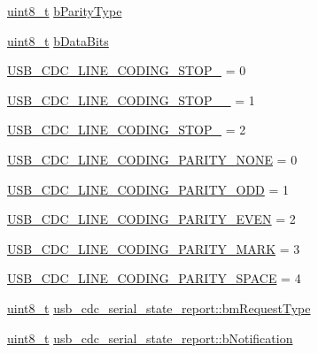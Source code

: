 \begin{DoxyCompactItemize}
\hyperlink{stdint_8h_aba7bc1797add20fe3efdf37ced1182c5}{uint8\-\_\-t} \hyperlink{group___p_i_o_s___u_s_b___d_e_f_s_ga47f5ab7fcc915dedd560214e61438bc3}{b\-Parity\-Type}
\item 
\hyperlink{stdint_8h_aba7bc1797add20fe3efdf37ced1182c5}{uint8\-\_\-t} \hyperlink{group___p_i_o_s___u_s_b___d_e_f_s_gaeb01baccbd5328de664ba39a4c295941}{b\-Data\-Bits}
\item 
\hyperlink{group___p_i_o_s___u_s_b___d_e_f_s_gac4eddf0a8ee341b7b3718d54fd8d3aca}{U\-S\-B\-\_\-\-C\-D\-C\-\_\-\-L\-I\-N\-E\-\_\-\-C\-O\-D\-I\-N\-G\-\_\-\-S\-T\-O\-P\-\_} = 0
\item 
\hyperlink{group___p_i_o_s___u_s_b___d_e_f_s_ga7e2d9fdd2a6d8787acb3822557bccf2f}{U\-S\-B\-\_\-\-C\-D\-C\-\_\-\-L\-I\-N\-E\-\_\-\-C\-O\-D\-I\-N\-G\-\_\-\-S\-T\-O\-P\-\_\-\_} = 1
\item 
\hyperlink{group___p_i_o_s___u_s_b___d_e_f_s_ga3538b3fcf1ee3c5f9f5c6440ee992bab}{U\-S\-B\-\_\-\-C\-D\-C\-\_\-\-L\-I\-N\-E\-\_\-\-C\-O\-D\-I\-N\-G\-\_\-\-S\-T\-O\-P\-\_} = 2
\item 
\hyperlink{group___p_i_o_s___u_s_b___d_e_f_s_gaac4a8093dc70d2faba2bfbecd8f3925e}{U\-S\-B\-\_\-\-C\-D\-C\-\_\-\-L\-I\-N\-E\-\_\-\-C\-O\-D\-I\-N\-G\-\_\-\-P\-A\-R\-I\-T\-Y\-\_\-\-N\-O\-N\-E} = 0
\item 
\hyperlink{group___p_i_o_s___u_s_b___d_e_f_s_gaae8333b5bc558121cfbf15fa45a3995b}{U\-S\-B\-\_\-\-C\-D\-C\-\_\-\-L\-I\-N\-E\-\_\-\-C\-O\-D\-I\-N\-G\-\_\-\-P\-A\-R\-I\-T\-Y\-\_\-\-O\-D\-D} = 1
\item 
\hyperlink{group___p_i_o_s___u_s_b___d_e_f_s_ga9368f7f6c69c75dcf7309d538ac75844}{U\-S\-B\-\_\-\-C\-D\-C\-\_\-\-L\-I\-N\-E\-\_\-\-C\-O\-D\-I\-N\-G\-\_\-\-P\-A\-R\-I\-T\-Y\-\_\-\-E\-V\-E\-N} = 2
\item 
\hyperlink{group___p_i_o_s___u_s_b___d_e_f_s_ga88095a84c73187be8de85b0d2570a1ac}{U\-S\-B\-\_\-\-C\-D\-C\-\_\-\-L\-I\-N\-E\-\_\-\-C\-O\-D\-I\-N\-G\-\_\-\-P\-A\-R\-I\-T\-Y\-\_\-\-M\-A\-R\-K} = 3
\item 
\hyperlink{group___p_i_o_s___u_s_b___d_e_f_s_ga8e20e35ec70602f6991738f7687070ec}{U\-S\-B\-\_\-\-C\-D\-C\-\_\-\-L\-I\-N\-E\-\_\-\-C\-O\-D\-I\-N\-G\-\_\-\-P\-A\-R\-I\-T\-Y\-\_\-\-S\-P\-A\-C\-E} = 4
\item 
\hyperlink{stdint_8h_aba7bc1797add20fe3efdf37ced1182c5}{uint8\-\_\-t} \hyperlink{group___p_i_o_s___u_s_b___d_e_f_s_gaaadf08281b8967b649e2ce6cef9f9279}{usb\-\_\-cdc\-\_\-serial\-\_\-state\-\_\-report\-::bm\-Request\-Type}
\item 
\hyperlink{stdint_8h_aba7bc1797add20fe3efdf37ced1182c5}{uint8\-\_\-t} \hyperlink{group___p_i_o_s___u_s_b___d_e_f_s_ga6d3890d58ae8ae0300f94f680f8ca090}{usb\-\_\-cdc\-\_\-serial\-\_\-state\-\_\-report\-::b\-Notification}

\end{DoxyCompactItemize}
